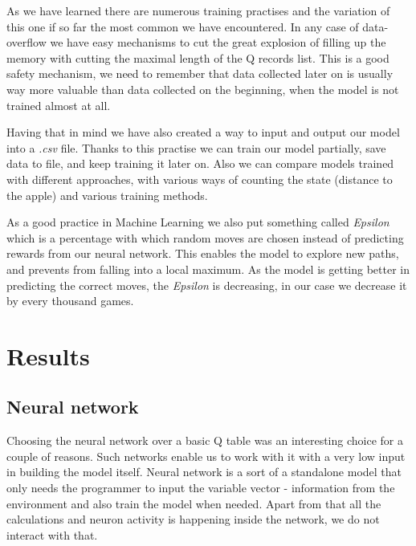 \documentclass[]{article}
\begin{document}
\par As we have learned there are numerous training practises and the variation of this one if so far the most common we have encountered. In any case of data-overflow we have easy mechanisms to cut the great explosion of filling up the memory with cutting the maximal length of the Q records list. This is a good safety mechanism, we need to remember that data collected later on is usually way more valuable than data collected on the beginning, when the model is not trained almost at all.

\par Having that in mind we have also created a way to input and output our model into a \textit{.csv} file. Thanks to this practise we can train our model partially, save data to file, and keep training it later on. Also we can compare models trained with different approaches, with various ways of counting the state (distance to the apple) and various training methods. 

\par As a good practice in Machine Learning we also put something called \textit{Epsilon} which is a percentage with which random moves are chosen instead of predicting rewards from our neural network. This enables the model to explore new paths, and prevents from falling into a local maximum. As the model is getting better in predicting the correct moves, the \textit{Epsilon} is decreasing, in our case we decrease it by every thousand games.

\section{Results}

\subsection{Neural network}

\par Choosing the neural network over a basic Q table was an interesting choice for a couple of reasons. Such networks enable us to work with it with a very low input in building the model itself. Neural network is a sort of a standalone model that only needs the programmer to input the variable vector - information from the environment and also train the model when needed. Apart from that all the calculations and neuron activity is happening inside the network, we do not interact with that.
\end{document}

